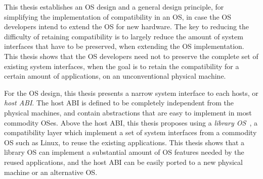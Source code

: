 This thesis establishes an OS design and a general design principle, for simplifying the implementation of compatibility in an OS, in case the OS developers intend to extend the OS for new hardware.
The key to reducing the difficulty of retaining compatibility
is to largely reduce the amount of system interfaces that have to be preserved,
when extending the OS implementation.
This thesis shows that the OS developers need not to preserve the complete set of existing system interfaces, when the goal is to retain the compatibility for a certain amount of applications, on an unconventional physical machine.



For the OS design, this thesis presents a narrow system interface to each hosts,
or {\em host ABI}.
The host ABI is defined to be completely independent from the physical machines,
and contain abstractions that are easy to implement in most commodity OSes.
Above the host ABI, this thesis proposes using a {\em library OS}~\cite{porter11drawbridge,engler95exokernel,libra,unikernels},
a compatibility layer which implement a set of system interfaces from a commodity OS such as Linux, to reuse the existing applications.
This thesis shows that a library OS can implement a substantial amount of OS features needed by the reused applications,
and the host ABI can be easily ported to a new physical machine or an alternative OS.


